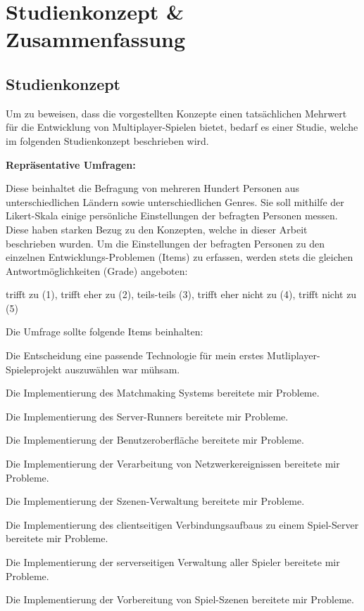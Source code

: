 \chapter{Studienkonzept \& Zusammenfassung }
\label{sec:zusammenfassung}

\section{Studienkonzept}
\label{studienkonzept}

Um zu beweisen, dass die vorgestellten Konzepte einen tatsächlichen Mehrwert für die Entwicklung von Multiplayer-Spielen bietet, bedarf es einer Studie, welche im folgenden Studienkonzept beschrieben wird.

\textbf{Repräsentative Umfragen:}

Diese beinhaltet die Befragung von mehreren Hundert Personen aus unterschiedlichen Ländern sowie unterschiedlichen Genres. Sie soll mithilfe der Likert-Skala \cite{Wikipedia.2022d} einige persönliche Einstellungen der befragten Personen messen. Diese haben starken Bezug zu den Konzepten, welche in dieser Arbeit beschrieben wurden. Um die Einstellungen der befragten Personen zu den einzelnen Entwicklungs-Problemen (Items) zu erfassen, werden stets die gleichen Antwortmöglichkeiten (Grade) angeboten:

trifft zu (1), trifft eher zu (2), teils-teils (3), trifft eher nicht zu (4), trifft nicht zu (5)

Die Umfrage sollte folgende Items beinhalten:

Die Entscheidung eine passende Technologie für mein erstes Mutliplayer-Spieleprojekt auszuwählen war mühsam.

Die Implementierung des Matchmaking Systems bereitete mir Probleme.

Die Implementierung des Server-Runners bereitete mir Probleme.

Die Implementierung der Benutzeroberfläche bereitete mir Probleme.

Die Implementierung der Verarbeitung von Netzwerkereignissen bereitete mir Probleme.

Die Implementierung der Szenen-Verwaltung bereitete mir Probleme.

Die Implementierung des clientseitigen Verbindungsaufbaus zu einem Spiel-Server bereitete mir Probleme.

Die Implementierung der serverseitigen Verwaltung aller Spieler bereitete mir Probleme.

Die Implementierung der Vorbereitung von Spiel-Szenen bereitete mir Probleme.

